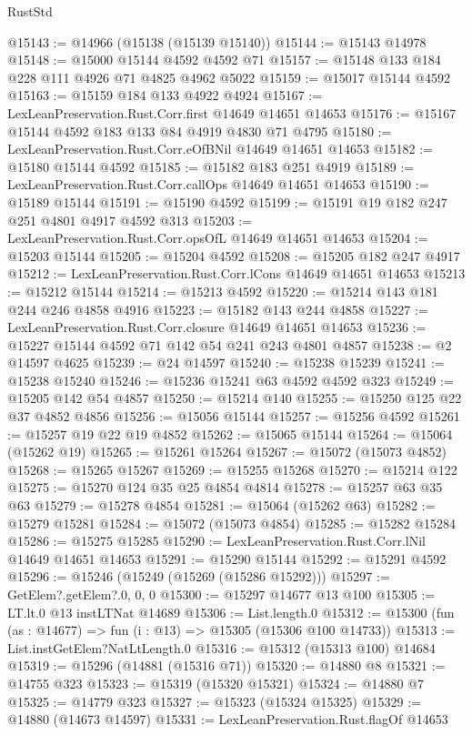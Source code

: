 \begin{lexlean}{RustStd}
\begin{coremodule}
@15143 := @14966 (@15138 (@15139 @15140))
@15144 := @15143 @14978
@15148 := @15000 @15144 @4592 @4592 @71
@15157 := @15148 @133 @184 @228 @111 @4926 @71 @4825 @4962 @5022
@15159 := @15017 @15144 @4592
@15163 := @15159 @184 @133 @4922 @4924
@15167 := LexLeanPreservation.Rust.Corr.first @14649 @14651 @14653
@15176 := @15167 @15144 @4592 @183 @133 @84 @4919 @4830 @71 @4795
@15180 := LexLeanPreservation.Rust.Corr.eOfBNil @14649 @14651 @14653
@15182 := @15180 @15144 @4592
@15185 := @15182 @183 @251 @4919
@15189 := LexLeanPreservation.Rust.Corr.callOps @14649 @14651 @14653
@15190 := @15189 @15144
@15191 := @15190 @4592
@15199 := @15191 @19 @182 @247 @251 @4801 @4917 @4592 @313
@15203 := LexLeanPreservation.Rust.Corr.opsOfL @14649 @14651 @14653
@15204 := @15203 @15144
@15205 := @15204 @4592
@15208 := @15205 @182 @247 @4917
@15212 := LexLeanPreservation.Rust.Corr.lCons @14649 @14651 @14653
@15213 := @15212 @15144
@15214 := @15213 @4592
@15220 := @15214 @143 @181 @244 @246 @4858 @4916
@15223 := @15182 @143 @244 @4858
@15227 := LexLeanPreservation.Rust.Corr.closure @14649 @14651 @14653
@15236 := @15227 @15144 @4592 @71 @142 @54 @241 @243 @4801 @4857
@15238 := @2 @14597 @4625
@15239 := @24 @14597
@15240 := @15238 @15239
@15241 := @15238 @15240
@15246 := @15236 @15241 @63 @4592 @4592 @323
@15249 := @15205 @142 @54 @4857
@15250 := @15214 @140
@15255 := @15250 @125 @22 @37 @4852 @4856
@15256 := @15056 @15144
@15257 := @15256 @4592
@15261 := @15257 @19 @22 @19 @4852
@15262 := @15065 @15144
@15264 := @15064 (@15262 @19)
@15265 := @15261 @15264
@15267 := @15072 (@15073 @4852)
@15268 := @15265 @15267
@15269 := @15255 @15268
@15270 := @15214 @122
@15275 := @15270 @124 @35 @25 @4854 @4814
@15278 := @15257 @63 @35 @63
@15279 := @15278 @4854
@15281 := @15064 (@15262 @63)
@15282 := @15279 @15281
@15284 := @15072 (@15073 @4854)
@15285 := @15282 @15284
@15286 := @15275 @15285
@15290 := LexLeanPreservation.Rust.Corr.lNil @14649 @14651 @14653
@15291 := @15290 @15144
@15292 := @15291 @4592
@15296 := @15246 (@15249 (@15269 (@15286 @15292)))
@15297 := GetElem?.getElem?.{0, 0, 0}
@15300 := @15297 @14677 @13 @100
@15305 := LT.lt.{0} @13 instLTNat @14689
@15306 := List.length.{0}
@15312 := @15300 (fun (as : @14677) => fun (i : @13) => @15305 (@15306 @100 @14733))
@15313 := List.instGetElem?NatLtLength.{0}
@15316 := @15312 (@15313 @100) @14684
@15319 := @15296 (@14881 (@15316 @71))
@15320 := @14880 @8
@15321 := @14755 @323
@15323 := @15319 (@15320 @15321)
@15324 := @14880 @7
@15325 := @14779 @323
@15327 := @15323 (@15324 @15325)
@15329 := @14880 (@14673 @14597)
@15331 := LexLeanPreservation.Rust.flagOf @14653

\end{coremodule}
\end{lexlean}
